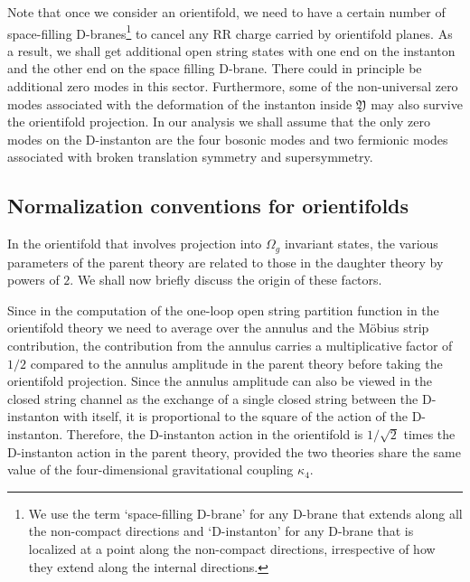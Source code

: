 \documentclass[12pt,a4paper]{article}
\def\CY{\mathfrak{Y}}
\begin{document}
Note that once we consider an orientifold, we need to have a certain number of
space-filling D-branes\footnote{We use the term `space-filling D-brane' for any
D-brane that extends along all the non-compact directions and `D-instanton' for any D-brane
that is localized at a point along the non-compact directions, irrespective of how they
extend along the internal directions.}
to cancel any RR charge carried by orientifold planes. As a result, we shall get additional
open string states with one end on the instanton and the other end on the space filling D-brane.
There could in principle be additional zero modes in this sector. Furthermore, some of the non-universal
zero modes associated with the deformation of the instanton inside $\CY$ may also survive the orientifold
projection. In our analysis we shall assume
that the only zero modes on the D-instanton are the four bosonic modes and two fermionic modes
associated with broken translation symmetry and supersymmetry.

\subsection{Normalization conventions for orientifolds} \label{snorm}

In the orientifold that involves projection into $\Omega_g$ invariant states,
the various parameters of the parent theory are related to those
in the daughter theory by powers of $2$. We shall now briefly discuss the origin of these
factors.

Since in the computation of the one-loop open string partition function in the
orientifold theory we need to average over the annulus and the M\"{o}bius strip
contribution, the contribution from the annulus carries a
multiplicative factor of $1/2$ compared to the annulus amplitude in the parent theory before
taking the orientifold projection. Since the annulus amplitude can also be viewed in the closed
string channel as the exchange of a single closed string between the D-instanton with itself, it is
proportional to the square of the action of the D-instanton. Therefore, the D-instanton action
in the orientifold is $1/\sqrt 2$ times the D-instanton action in the parent theory, provided the
two theories share the same value of the four-dimensional gravitational coupling $\kappa_4$.
\end{document}
